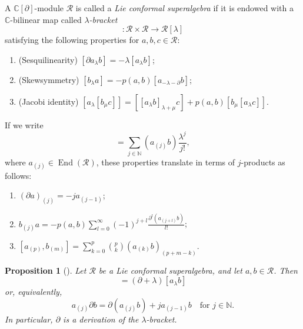 \documentclass[a4paper, 12pt, reqno]{amsart}
\newtheorem{proposition}[theorem]{Proposition}
\theoremstyle{remark}
\DeclareMathOperator{\End}{End}
\begin{document}
A $\mathbb{C}[\partial]$-module $\mathcal{R}$ is called a \emph{Lie conformal superalgebra} if it is endowed with a $\mathbb{C}$-bilinear map called \emph{$\lambda$-bracket}
\begin{equation*}
  [\bullet_{\lambda}\bullet]: \mathcal{R} \times \mathcal{R} \to \mathcal{R}[\lambda]
\end{equation*}
satisfying the following properties for $a, b, c \in \mathcal{R}$:
\begin{enumerate}
\item (Sesquilinearity) $[\partial a_{\lambda}b] = -\lambda[a_{\lambda}b]$;
\item (Skewsymmetry) $[b_{\lambda}a] = -p(a, b)[a_{-\lambda - \partial}b]$;
\item (Jacobi identity) $[a_{\lambda}[b_{\mu}c]] = [[a_{\lambda}b]_{\lambda + \mu}c] + p(a, b)[b_{\mu}[a_{\lambda}c]]$.
\end{enumerate}

If we write
\begin{equation*}
  [a_{\lambda}b] = \sum_{j \in \mathbb{N}}(a_{(j)}b)\frac{\lambda^j}{j!},
\end{equation*}
where $a_{(j)} \in \End(\mathcal{R})$, these properties translate in terms of $j$-products as follows:
\begin{enumerate}
\item $(\partial a)_{(j)} = -ja_{(j - 1)}$;
\item $b_{(j)}a = -p(a, b)\sum_{l = 0}^{\infty}(-1)^{j + l}\frac{\partial^l(a_{(j + l)}b)}{l!}$;
\item $[a_{(p)}, b_{(m)}] = \sum_{k = 0}^p\binom{p}{k}(a_{(k)}b)_{(p + m - k)}$.
\end{enumerate}

\begin{proposition}[{\cite[Remark 2.5.3]{nozaradan_introduction_2008}}]
  \label{prp:4}
  Let $\mathcal{R}$ be a Lie conformal superalgebra, and let $a, b \in \mathcal{R}$.
  Then
  \begin{equation*}
    [a_{\lambda}\partial b] = (\partial + \lambda)[a_{\lambda}b]
  \end{equation*}
  or, equivalently,
  \begin{equation*}
    a_{(j)}\partial b = \partial(a_{(j)}b) + ja_{(j - 1)}b \quad \text{for $j \in \mathbb{N}$}.
  \end{equation*}
  In particular, $\partial$ is a derivation of the $\lambda$-bracket.
\end{proposition}
\end{document}
